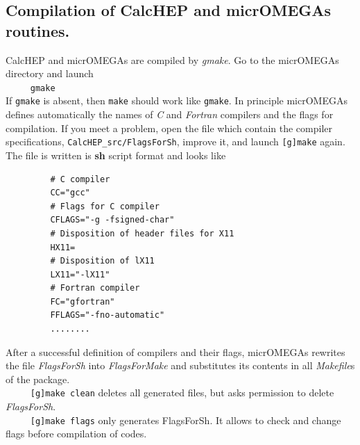 \documentclass[12pt,a4paper]{article}
\begin{document}
\subsection{ Compilation of CalcHEP and micrOMEGAs routines.}
   CalcHEP and micrOMEGAs are compiled by {\it gmake}. Go to the micrOMEGAs directory
and launch\\
\verb|     gmake|\\
If {\tt gmake} is absent, then {\tt make} should work like {\tt gmake}.
In principle  micrOMEGAs  defines automatically the names of {\it C} and {\it
Fortran} compilers and the flags for
compilation. If you meet a  problem, open the file which contain the compiler specifications, 
\verb|CalcHEP_src/FlagsForSh|,
 improve it, and launch {\tt [g]make} 
again. The file  is written is {\bf sh} script format and looks like
\begin{verbatim}
         # C compiler
         CC="gcc"
         # Flags for C compiler
         CFLAGS="-g -fsigned-char"
         # Disposition of header files for X11
         HX11=
         # Disposition of lX11
         LX11="-lX11"
         # Fortran compiler
         FC="gfortran"
         FFLAGS="-fno-automatic"
         ........
\end{verbatim}
After a successful definition of compilers and their flags,   micrOMEGAs rewrites the file 
 {\it FlagsForSh} into {\it FlagsForMake} and substitutes its contents in all {\it
Makefile}s of the package.\\
\verb|     [g]make clean|    deletes all generated files, but asks permission to
delete {\it FlagsForSh}.\\
\verb|     [g]make flags|       only generates FlagsForSh. It allows to check and
change  flags before compilation of codes.


\end{document}
